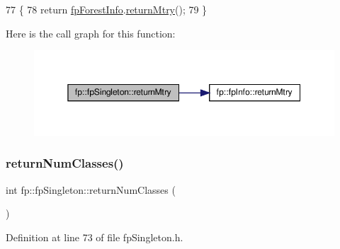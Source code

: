 \begin{DoxyCode}
77                                    \{
78                 \textcolor{keywordflow}{return} \hyperlink{classfp_1_1fpSingleton_a85965009befa72a749ae498fa5b6ccfa}{fpForestInfo}.\hyperlink{classfp_1_1fpInfo_a058477c4f05818c220efa469b7b630bb}{returnMtry}();
79             \}
\end{DoxyCode}
Here is the call graph for this function\+:\nopagebreak
\begin{figure}[H]
\begin{center}
\leavevmode
\includegraphics[width=350pt]{classfp_1_1fpSingleton_a45ae68ceb91880ddbc0e049a47c371eb_cgraph}
\end{center}
\end{figure}
\mbox{\label{classfp_1_1fpSingleton_a5602580110329a6b25602b1789e4e2c2}} 
\subsubsection{\texorpdfstring{return\+Num\+Classes()}{returnNumClasses()}}
{\footnotesize\ttfamily int fp\+::fp\+Singleton\+::return\+Num\+Classes (\begin{DoxyParamCaption}{ }\end{DoxyParamCaption})\hspace{0.3cm}{\ttfamily [inline]}}



Definition at line 73 of file fp\+Singleton.\+h.



